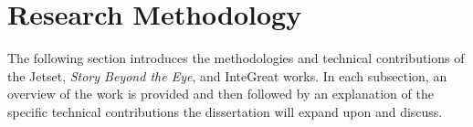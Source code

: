 \section{Research Methodology}
\label{sec:methods}

The following section introduces the methodologies and technical contributions of the Jetset, \emph{Story Beyond the Eye}, and InteGreat works.
In each subsection, an overview of the work is provided and then followed by an explanation of the specific technical contributions the dissertation will expand upon and discuss.







